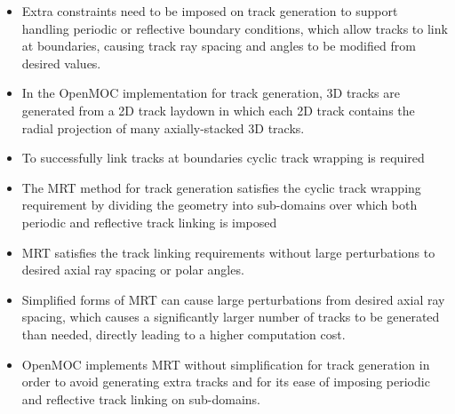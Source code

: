 \newpage
\vfill
\begin{highlightsbox}[frametitle=Highlights]
\begin{itemize}
  \item Extra constraints need to be imposed on track generation to support handling periodic or reflective boundary conditions, which allow tracks to link at boundaries, causing track ray spacing and angles to be modified from desired values.
  \item In the OpenMOC implementation for track generation, 3D tracks are generated from a 2D track laydown in which each 2D track contains the radial projection of many axially-stacked 3D tracks.
  \item To successfully link tracks at boundaries cyclic track wrapping is required
  \item The \ac{MRT} method for track generation satisfies the cyclic track wrapping requirement by dividing the geometry into sub-domains over which both periodic and reflective track linking is imposed
  \item \ac{MRT} satisfies the track linking requirements without large perturbations to desired axial ray spacing or polar angles.
  \item Simplified forms of \ac{MRT} can cause large perturbations from desired axial ray spacing, which causes a significantly larger number of tracks to be generated than needed, directly leading to a higher computation cost.
  \item OpenMOC implements \ac{MRT} without simplification for track generation in order to avoid generating extra tracks and for its ease of imposing periodic and reflective track linking on sub-domains.
\end{itemize}
\end{highlightsbox}
\vfill